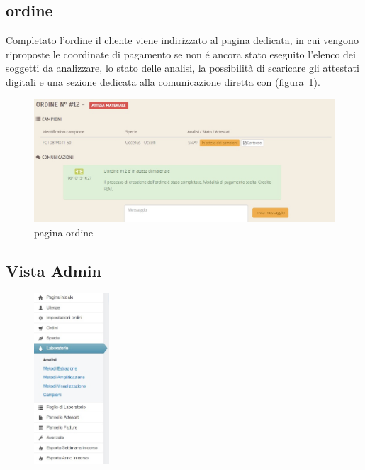 \subsection*{ordine}
\label{subs:po}
Completato l'ordine il cliente viene indirizzato al pagina dedicata, in cui vengono riproposte le coordinate di pagamento se non é ancora stato eseguito l'elenco dei soggetti da analizzare, lo stato delle analisi, la possibilità di scaricare gli attestati digitali e una sezione dedicata alla comunicazione diretta con {\fem} (figura~\ref{fig:po}).

\begin{figure}
 \includegraphics[width=1\textwidth]{images/po} 
 \caption{pagina ordine}
 \label{fig:po}
\end{figure}

\newpage
\subsection{Vista Admin}
\label{subs:admin}

\begin{figure}
  \begin{center}
    \includegraphics[width=0.25\textwidth]{images/suit}
  \end{center}
\end{figure}

